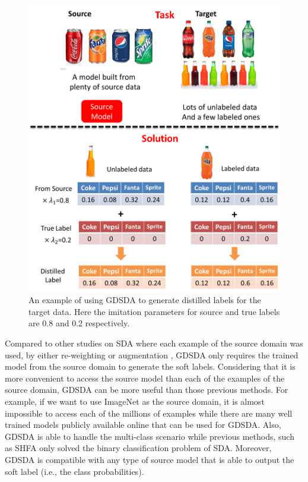 \begin{figure}
	\centering
	\includegraphics[scale=.7]{aaai/figure/explain.png}
	\caption{An example of using GDSDA to generate distilled labels for the target data. Here the imitation parameters for source and true labels are 0.8 and 0.2 respectively.}\label{fig:aaai:explain}
\end{figure}


Compared to other studies on SDA where each example of the source domain was used, by either re-weighting \cite{Donahue_2013_CVPR,duan2012visual} or augmentation \cite{daume2010frustratingly}, GDSDA only requires the trained model from the source domain to generate the soft labels. Considering that it is more convenient to access the source model than each of the examples of the source domain, GDSDA can be more useful than those previous methods. For example, if we want to use ImageNet \cite{imagenet_cvpr09} as the source domain, it is almost impossible to access each of the millions of examples while there are many well trained models publicly available online that can be used for GDSDA. Also, GDSDA is able to handle the multi-class scenario while previous methods, such as SHFA\cite{duan2012learning} only solved the binary classification problem of SDA. Moreover, GDSDA is compatible with any type of source model that is able to output the soft label (i.e., the class probabilities).

